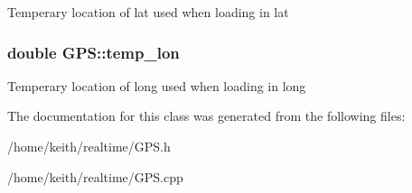 Temperary location of lat used when loading in lat \hypertarget{classGPS_a4b108cba87ab121532c180e214d0c7fa}{
\subsubsection[{temp\-\_\-lon}]{\setlength{\rightskip}{0pt plus 5cm}double G\-P\-S\-::temp\-\_\-lon\hspace{0.3cm}{\ttfamily [protected]}}}\label{classGPS_a4b108cba87ab121532c180e214d0c7fa}
Temperary location of long used when loading in long 

The documentation for this class was generated from the following files\-:\begin{DoxyCompactItemize}
\item 
/home/keith/realtime/G\-P\-S.\-h\item 
/home/keith/realtime/G\-P\-S.\-cpp\end{DoxyCompactItemize}

